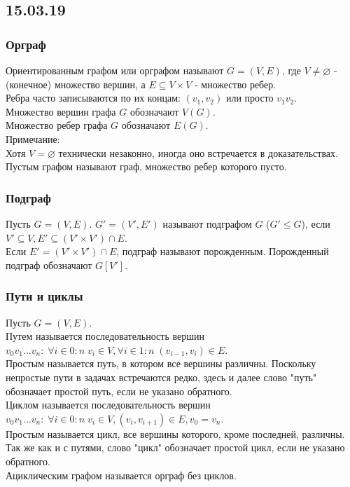 \subsection{15.03.19}
\subsubsection{Орграф}
Ориентированным графом или орграфом называют $G = (V, E)$, где $V \not= \varnothing$ - (конечное) множество вершин, а $E \subseteq V \times V$ - множество ребер.\\
Ребра часто записываются по их концам: $(v_1, v_2)$ или просто $v_1v_2$.\\
Множество вершин графа $G$ обозначают $V(G)$.\\
Множество ребер графа $G$ обозначают $E(G)$.\\
Примечание: \\
Хотя $V = \varnothing$ технически незаконно, иногда оно встречается в доказательствах.\\
Пустым графом называют граф, множество ребер которого пусто.\\
\subsubsection{Подграф}
Пусть $G = (V, E)$. $G' = (V', E')$ называют подграфом $G$ ($G'\leq G$), если $V' \subseteq V, E' \subseteq (V' \times V') \cap E$.\\
Если $E' = (V' \times V') \cap E$, подграф называют порожденным. Порожденный подграф обозначают $G[V']$.\\
\subsubsection{Пути и циклы}
Пусть $G = (V, E)$.\\
Путем называется последовательность вершин $v_0v_1...v_n: \; \forall i \in 0:n \; v_i \in V, \forall i \in 1:n \; (v_{i - 1}, v_i) \in E$.\\
Простым называется путь, в котором все вершины различны. Поскольку непростые пути в задачах встречаются редко, здесь и далее слово "путь" обозначает простой путь, если не указано обратного.\\
Циклом называется последовательность вершин $v_0v_1...v_n: \; \forall i \in 0:n \; v_i \in V, (v_i, v_{i + 1}) \in E, v_0 = v_n$.\\
Простым называется цикл, все вершины которого, кроме последней, различны. Так же как и с путями, слово "цикл" обозначает простой цикл, если не указано обратного.\\
Ациклическим графом называется орграф без циклов.
